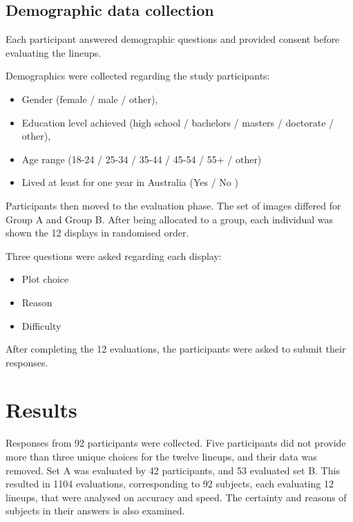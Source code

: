 \documentclass[journal]{vgtc}                     %
\begin{document}
\hypertarget{demographic-data-collection}{%
\subsection{Demographic data collection}\label{demographic-data-collection}}

Each participant answered demographic questions and provided consent before evaluating the lineups.

Demographics were collected regarding the study participants:

\begin{itemize} \itemsep 0in
\item
  Gender (female / male / other),
\item
  Education level achieved (high school / bachelors / masters / doctorate / other),
\item
  Age range (18-24 / 25-34 / 35-44 / 45-54 / 55+ / other)
\item
  Lived at least for one year in Australia (Yes / No )
\end{itemize}

Participants then moved to the evaluation phase.
The set of images differed for Group A and Group B.
After being allocated to a group, each individual was shown the 12 displays in randomised order.

Three questions were asked regarding each display:

\begin{itemize} \itemsep 0in
\item
  Plot choice
\item
  Reason
\item
  Difficulty
\end{itemize}

After completing the 12 evaluations, the participants were asked to submit their responses.

\hypertarget{results}{%
\section{Results}\label{results}}

Responses from 92 participants were collected. Five participants did not provide more than three unique choices for the twelve lineups, and their data was removed. Set A was evaluated by 42 participants, and 53 evaluated set B. This resulted in 1104 evaluations, corresponding to 92 subjects, each evaluating 12 lineups, that were analysed on accuracy and speed. The certainty and reasons of subjects in their answers is also examined.
\end{document}
